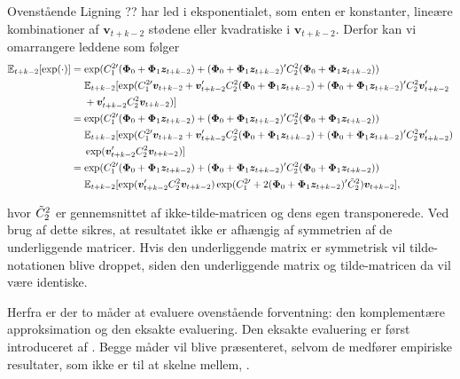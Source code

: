 \documentclass[
  a4paper,
  oneside]{memoir}
\begin{document}
Ovenstående Ligning ?? har led i eksponentialet, som enten er konstanter, lineære kombinationer af \(\bm{v}_{t+k-2}\) stødene eller kvadratiske i \(\bm{v}_{t+k-2}\). Derfor kan vi omarrangere leddene som følger
\begin{align*}
\mathbb{E}_{t+k-2}[\exp(\cdot)] &= \exp( C_1^{2\prime} (\bm{\Phi}_0+\bm{\Phi}_1\bm{z}_{t+k-2} ) + (\bm{\Phi}_0+\bm{\Phi}_1\bm{z}_{t+k-2} )' C_2^2 (\bm{\Phi}_0+\bm{\Phi}_1\bm{z}_{t+k-2} ))\\
                                &\,\,\quad \mathbb{E}_{t+k-2}[\exp( C_1^{2\prime} \bm{v}_{t+k-2}+ \bm{v}_{t+k-2}' C_2^2 (\bm{\Phi}_0+\bm{\Phi}_1\bm{z}_{t+k-2} ) + (\bm{\Phi}_0+\bm{\Phi}_1\bm{z}_{t+k-2} )' C_2^{2} \bm{v}_{t+k-2}'\\
                                &\,\,\quad+ \bm{v}_{t+k-2}' C_2^2 \bm{v}_{t+k-2} )]\\
                                &= \exp( C_1^{2\prime} (\bm{\Phi}_0+\bm{\Phi}_1\bm{z}_{t+k-2} ) + (\bm{\Phi}_0+\bm{\Phi}_1\bm{z}_{t+k-2} )' C_2^2 (\bm{\Phi}_0+\bm{\Phi}_1\bm{z}_{t+k-2} ))\\
                                &\,\,\quad \mathbb{E}_{t+k-2}[\exp( C_1^{2\prime} \bm{v}_{t+k-2}+ \bm{v}_{t+k-2}' C_2^2 (\bm{\Phi}_0+\bm{\Phi}_1\bm{z}_{t+k-2} ) + (\bm{\Phi}_0+\bm{\Phi}_1\bm{z}_{t+k-2} )' C_2^{2} \bm{v}_{t+k-2}')\\
                                &\,\,\quad\exp(\bm{v}_{t+k-2}' C_2^2 \bm{v}_{t+k-2} )]\\
                                &=\exp( C_1^{2\prime} (\bm{\Phi}_0+\bm{\Phi}_1\bm{z}_{t+k-2} ) + (\bm{\Phi}_0+\bm{\Phi}_1\bm{z}_{t+k-2} )' C_2^2 (\bm{\Phi}_0+\bm{\Phi}_1\bm{z}_{t+k-2} ))\\
                                &\,\,\quad \mathbb{E}_{t+k-2}[ \exp(\bm{v}_{t+k-2}' C_2^2 \bm{v}_{t+k-2} ) \exp( C_1^{2\prime} + 2(\bm{\Phi}_0+\bm{\Phi}_1\bm{z}_{t+k-2})' \Tilde{C}_2^{2} )   \bm{v}_{t+k-2}],
\end{align*}

hvor \(\Tilde{C}_2^{2}\) er gennemsnittet af ikke-tilde-matricen og dens egen transponerede. Ved brug af dette sikres, at resultatet ikke er afhængig af symmetrien af de underliggende matricer. Hvis den underliggende matrix er symmetrisk vil tilde-notationen blive droppet, siden den underliggende matrix og tilde-matricen da vil være identiske.

Herfra er der to måder at evaluere ovenstående forventning: den komplementære approksimation og den eksakte evaluering. Den eksakte evaluering er først introduceret af \citep{CampVicCha2003}. Begge måder vil blive præsenteret, selvom de medfører empiriske resultater, som ikke er til at skelne mellem, \citep{JurVic2011}.
\end{document}
